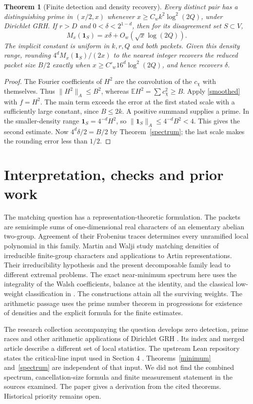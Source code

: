 \documentclass[11pt,letterpaper]{article}
\newtheorem{theorem}{Theorem}
\newcommand{\one}{\mathbf 1}
\newcommand{\E}{\mathbb E}
\begin{document}
\begin{theorem}[Finite detection and density recovery]\label{finiteprim}
Every distinct pair has a distinguishing prime in \((x/2,x)\) whenever \(x\ge C_w k^2\log^2(2Q)\), under Dirichlet GRH. If \(r>D\) and \(0<\delta<2^{1-d}\), then for its disagreement set \(S\subset V\),
\[
 M_x(\one_S)=x\delta+O_w(\sqrt{x}\log(2Q)).
\]
The implicit constant is uniform in \(k,r,Q\) and both packets. Given this density range, rounding \(4^d M_x(\one_S)/(2x)\) to the nearest integer recovers the reduced packet size \(B/2\) exactly when \(x\ge C'_w16^d\log^2(2Q)\), and hence recovers \(\delta\).
\end{theorem}
\begin{proof}
The Fourier coefficients of \(H^2\) are the convolution of the \(c_\chi\) with themselves. Thus \(\|H^2\|_A\le B^2\), whereas \(\E H^2=\sum c_\chi^2\ge B\). Apply \eqref{smoothed} with \(f=H^2\). The main term exceeds the error at the first stated scale with a sufficiently large constant, since \(B\le2k\). A positive summand supplies a prime. In the smaller-density range \(\one_S=4^{-d}H^2\), so \(\|\one_S\|_A\le4^{-d}B^2<4\). This gives the second estimate. Now \(4^d\delta/2=B/2\) by Theorem~\ref{spectrum}; the last scale makes the rounding error less than \(1/2\).
\end{proof}

\newpage
\section{Interpretation, checks and prior work}
The matching question has a representation-theoretic formulation. The packets are semisimple sums of one-dimensional real characters of an elementary abelian two-group. Agreement of their Frobenius traces determines every unramified local polynomial in this family. Martin and Walji \cite{MW} study matching densities of irreducible finite-group characters and applications to Artin representations. Their irreducibility hypothesis and the present decomposable family lead to different extremal problems. The exact near-minimum spectrum here uses the integrality of the Walsh coefficients, balance at the identity, and the classical low-weight classification in \cite{KT}. The constructions attain all the surviving weights. The arithmetic passage uses the prime number theorem in progressions for existence of densities and the explicit formula for the finite estimates.

The research collection accompanying the question develops zero detection, prime races and other arithmetic applications of Dirichlet GRH \cite{PI}. Its index and merged article describe a different set of local statistics. The upstream Lean repository states the critical-line input used in Section 4 \cite{lean}. Theorems~\ref{minimum} and~\ref{spectrum} are independent of that input. We did not find the combined spectrum, cancellation-size formula and finite measurement statement in the sources examined. The paper gives a derivation from the cited theorems. Historical priority remains open.
\end{document}
